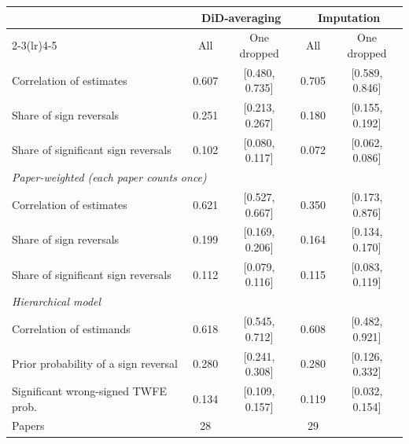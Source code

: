 \begin{tabular}{lcccc}
\toprule
 & \multicolumn{2}{c}{DiD-averaging} & \multicolumn{2}{c}{Imputation} \\
\cmidrule(lr){2-3}\cmidrule(lr){4-5}
 & All & One dropped & All & One dropped \\
\midrule
Correlation of estimates & 0.607 & [0.480, 0.735] & 0.705 & [0.589, 0.846] \\
Share of sign reversals & 0.251 & [0.213, 0.267] & 0.180 & [0.155, 0.192] \\
Share of significant sign reversals & 0.102 & [0.080, 0.117] & 0.072 & [0.062, 0.086] \\
\midrule
\multicolumn{5}{l}{\emph{Paper-weighted (each paper counts once)}} \\
Correlation of estimates & 0.621 & [0.527, 0.667] & 0.350 & [0.173, 0.876] \\
Share of sign reversals & 0.199 & [0.169, 0.206] & 0.164 & [0.134, 0.170] \\
Share of significant sign reversals & 0.112 & [0.079, 0.116] & 0.115 & [0.083, 0.119] \\
\midrule
\multicolumn{5}{l}{\emph{Hierarchical model}} \\
Correlation of estimands & 0.618 & [0.545, 0.712] & 0.608 & [0.482, 0.921] \\
Prior probability of a sign reversal & 0.280 & [0.241, 0.308] & 0.280 & [0.126, 0.332] \\
Significant wrong-signed TWFE prob. & 0.134 & [0.109, 0.157] & 0.119 & [0.032, 0.154] \\
\midrule
Papers & 28 & & 29 & \\
\bottomrule
\end{tabular}
